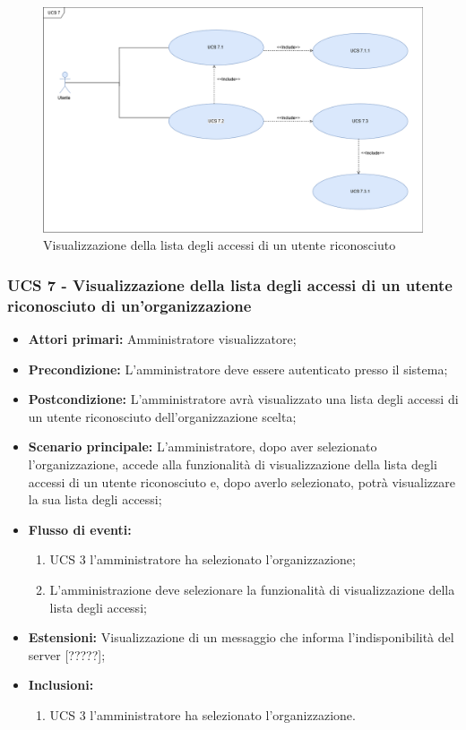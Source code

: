 \begin{figure}[h]
	\centering
	\includegraphics[scale=0.3]{sezioni/UseCase/Immagini/UCS7.png}
	\caption{Visualizzazione della lista degli accessi di un utente riconosciuto}
\end{figure}

\subsubsection{UCS 7 - Visualizzazione della lista degli accessi di un utente riconosciuto di un'organizzazione}%
\begin{itemize}
\item \textbf{Attori primari:} Amministratore visualizzatore;
\item \textbf{Precondizione:} L’amministratore deve essere autenticato presso il sistema;
\item \textbf{Postcondizione:} L’amministratore avrà visualizzato una lista degli accessi di un utente riconosciuto dell'organizzazione scelta;
\item \textbf{Scenario principale:} L’amministratore, dopo aver selezionato l'organizzazione, accede alla funzionalità di visualizzazione della lista degli accessi di un utente riconosciuto e, dopo averlo selezionato, potrà visualizzare la sua lista degli accessi;
\item \textbf{Flusso di eventi:} 
\begin{enumerate}
	\item UCS 3 l'amministratore ha selezionato l'organizzazione;
	\item L'amministrazione deve selezionare la funzionalità di visualizzazione della lista degli accessi;
\end{enumerate}
\item \textbf{Estensioni:} Visualizzazione di un messaggio che informa l’indisponibilità del server [?????];
\item \textbf{Inclusioni:}
\begin{enumerate}
	\item UCS 3 l'amministratore ha selezionato l'organizzazione.
\end{enumerate}
\end{itemize}

